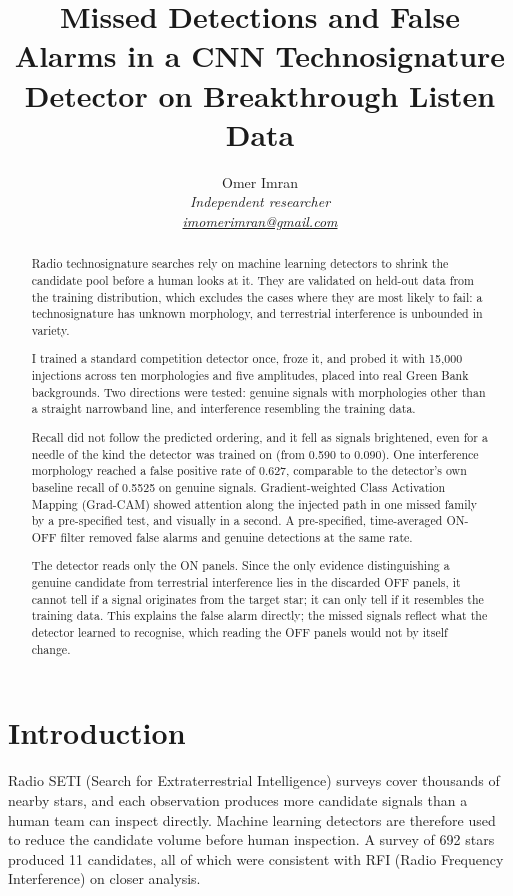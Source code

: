 \documentclass[11pt]{article}
\title{\Large\bfseries Missed Detections and False Alarms in a CNN Technosignature Detector on Breakthrough Listen Data}
\author{Omer Imran\\[2pt] \small\itshape Independent researcher\\ \small\href{mailto:imomerimran@gmail.com}{imomerimran@gmail.com}}
\date{}
\begin{document}
\maketitle\thispagestyle{plain}

\begin{abstract}
Radio technosignature searches rely on machine learning detectors to shrink the candidate pool before a human looks at it. They are validated on held-out data from the training distribution, which excludes the cases where they are most likely to fail: a technosignature has unknown morphology, and terrestrial interference is unbounded in variety.

I trained a standard competition detector once, froze it, and probed it with 15,000 injections across ten morphologies and five amplitudes, placed into real Green Bank backgrounds. Two directions were tested: genuine signals with morphologies other than a straight narrowband line, and interference resembling the training data.

Recall did not follow the predicted ordering, and it fell as signals brightened, even for a needle of the kind the detector was trained on (from 0.590 to 0.090). One interference morphology reached a false positive rate of 0.627, comparable to the detector's own baseline recall of 0.5525 on genuine signals. Gradient-weighted Class Activation Mapping (Grad-CAM) showed attention along the injected path in one missed family by a pre-specified test, and visually in a second. A pre-specified, time-averaged ON-OFF filter removed false alarms and genuine detections at the same rate.

The detector reads only the ON panels. Since the only evidence distinguishing a genuine candidate from terrestrial interference lies in the discarded OFF panels, it cannot tell if a signal originates from the target star; it can only tell if it resembles the training data. This explains the false alarm directly; the missed signals reflect what the detector learned to recognise, which reading the OFF panels would not by itself change.
\end{abstract}

\section{Introduction}
Radio SETI (Search for Extraterrestrial Intelligence) surveys cover thousands of nearby stars, and each observation produces more candidate signals than a human team can inspect directly. Machine learning detectors are therefore used to reduce the candidate volume before human inspection. A survey of 692 stars \citep{enriquez2017} produced 11 candidates, all of which were consistent with RFI (Radio Frequency Interference) on closer analysis.
\end{document}
